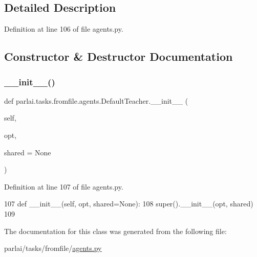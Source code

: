\subsection{Detailed Description}


Definition at line 106 of file agents.\+py.



\subsection{Constructor \& Destructor Documentation}
\mbox{\label{classparlai_1_1tasks_1_1fromfile_1_1agents_1_1DefaultTeacher_a4193d0c62cc2b0a602b6b53cf34e43f1}} 
\subsubsection{\texorpdfstring{\+\_\+\+\_\+init\+\_\+\+\_\+()}{\_\_init\_\_()}}
{\footnotesize\ttfamily def parlai.\+tasks.\+fromfile.\+agents.\+Default\+Teacher.\+\_\+\+\_\+init\+\_\+\+\_\+ (\begin{DoxyParamCaption}\item[{}]{self,  }\item[{}]{opt,  }\item[{}]{shared = {\ttfamily None} }\end{DoxyParamCaption})}



Definition at line 107 of file agents.\+py.


\begin{DoxyCode}
107     \textcolor{keyword}{def }\_\_init\_\_(self, opt, shared=None):
108         super().\_\_init\_\_(opt, shared)
109 \end{DoxyCode}


The documentation for this class was generated from the following file\+:\begin{DoxyCompactItemize}
\item 
parlai/tasks/fromfile/\hyperlink{parlai_2tasks_2fromfile_2agents_8py}{agents.\+py}\end{DoxyCompactItemize}
